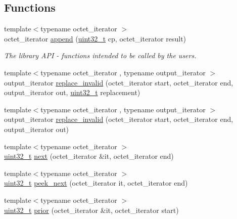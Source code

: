 \subsection*{Functions}
\begin{DoxyCompactItemize}
\item 
{\footnotesize template$<$typename octet\+\_\+iterator $>$ }\\octet\+\_\+iterator \hyperlink{namespaceutf8_a3827e78596fc38cfdebd721e9c45c901}{append} (\hyperlink{namespaceutf8_a846259d2f173d524282583fc9d825b00}{uint32\+\_\+t} cp, octet\+\_\+iterator result)
\begin{DoxyCompactList}\small\item\em The library A\+P\+I -\/ functions intended to be called by the users. \end{DoxyCompactList}\item 
{\footnotesize template$<$typename octet\+\_\+iterator , typename output\+\_\+iterator $>$ }\\output\+\_\+iterator \hyperlink{namespaceutf8_a07dcd36a2185e5c9f0b19dd88859cd6c}{replace\+\_\+invalid} (octet\+\_\+iterator start, octet\+\_\+iterator end, output\+\_\+iterator out, \hyperlink{namespaceutf8_a846259d2f173d524282583fc9d825b00}{uint32\+\_\+t} replacement)
\item 
{\footnotesize template$<$typename octet\+\_\+iterator , typename output\+\_\+iterator $>$ }\\output\+\_\+iterator \hyperlink{namespaceutf8_a13db09b6629724205302c623b76db028}{replace\+\_\+invalid} (octet\+\_\+iterator start, octet\+\_\+iterator end, output\+\_\+iterator out)
\item 
{\footnotesize template$<$typename octet\+\_\+iterator $>$ }\\\hyperlink{namespaceutf8_a846259d2f173d524282583fc9d825b00}{uint32\+\_\+t} \hyperlink{namespaceutf8_afc093dfde66a6f52cb4a5caefe0e580d}{next} (octet\+\_\+iterator \&it, octet\+\_\+iterator end)
\item 
{\footnotesize template$<$typename octet\+\_\+iterator $>$ }\\\hyperlink{namespaceutf8_a846259d2f173d524282583fc9d825b00}{uint32\+\_\+t} \hyperlink{namespaceutf8_a42451db4241d57afe46e61f6a966ee8d}{peek\+\_\+next} (octet\+\_\+iterator it, octet\+\_\+iterator end)
\item 
{\footnotesize template$<$typename octet\+\_\+iterator $>$ }\\\hyperlink{namespaceutf8_a846259d2f173d524282583fc9d825b00}{uint32\+\_\+t} \hyperlink{namespaceutf8_a9a599fdd8a16ce65e3e72192db9d499b}{prior} (octet\+\_\+iterator \&it, octet\+\_\+iterator start)

\end{DoxyCompactItemize}
